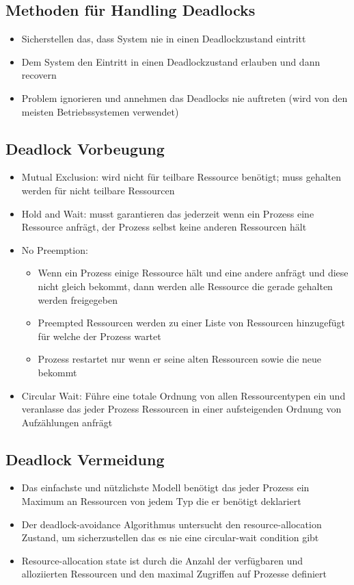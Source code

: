 \documentclass[a4paper]{scrreprt}
\begin{document}
		\subsection{Methoden für Handling Deadlocks}
			\begin{itemize}
				\item Sicherstellen das, dass System nie in einen Deadlockzustand eintritt
				\item Dem System den Eintritt in einen Deadlockzustand erlauben und dann recovern
				\item Problem ignorieren und annehmen das Deadlocks nie auftreten (wird von den meisten Betriebssystemen verwendet)
			\end{itemize}
		\subsection{Deadlock Vorbeugung}
			\begin{itemize}
				\item Mutual Exclusion: wird nicht für teilbare Ressource benötigt; muss gehalten werden für nicht teilbare Ressourcen
				\item Hold and Wait: musst garantieren das jederzeit wenn ein Prozess eine Ressource anfrägt, der Prozess selbst keine anderen Ressourcen hält
				\item No Preemption: 
					\begin{itemize}
						\item Wenn ein Prozess einige Ressource hält und eine andere anfrägt und diese nicht gleich bekommt, dann werden alle Ressource die gerade gehalten werden freigegeben
						\item Preempted Ressourcen werden zu einer Liste von Ressourcen hinzugefügt für welche der Prozess wartet
						\item Prozess restartet nur wenn er seine alten Ressourcen sowie die neue bekommt
					\end{itemize}
				\item Circular Wait: Führe eine totale Ordnung von allen Ressourcentypen ein und veranlasse das jeder Prozess Ressourcen in einer aufsteigenden Ordnung von Aufzählungen anfrägt
			\end{itemize}
		
		\subsection {Deadlock Vermeidung}
			\begin{itemize}
				\item Das einfachste und nützlichste Modell benötigt das jeder Prozess ein Maximum an Ressourcen von jedem Typ die er benötigt deklariert
				\item Der deadlock-avoidance Algorithmus untersucht den resource-allocation Zustand, um sicherzustellen das es nie eine circular-wait condition gibt
				\item Resource-allocation state ist durch die Anzahl der verfügbaren und alloziierten Ressourcen und den maximal Zugriffen auf Prozesse definiert 
			\end{itemize}
			
\end{document}
